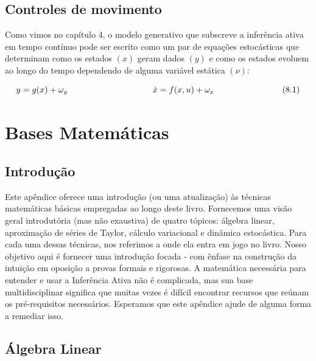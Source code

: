 \documentclass[
  12pt,
]{book}
\begin{document}
\hypertarget{controles-de-movimento}{%
\section{Controles de movimento}\label{controles-de-movimento}}

Como vimos no capítulo 4, o modelo generativo que subscreve a inferência ativa em tempo contínuo pode ser escrito como um par de equações estocásticas que determinam como os estados \((x)\) geram dados \((y)\) e como os estados evoluem ao longo do tempo dependendo de alguma variável estática \((\nu)\):

\[\begin{equation} 
y=g(x)+\omega_y \qquad\qquad\qquad\qquad\quad\quad\quad  \\ 
\dot x = f(x,u) + \omega_x \qquad\qquad\qquad\qquad (8.1)
\end{equation}\]

\cleardoublepage

\hypertarget{appendix-apuxeandice}{%
\appendix}


\hypertarget{bases-matemuxe1ticas}{%
\chapter{Bases Matemáticas}\label{bases-matemuxe1ticas}}

\hypertarget{introduuxe7uxe3o-8}{%
\section{Introdução}\label{introduuxe7uxe3o-8}}

Este apêndice oferece uma introdução (ou uma atualização) às técnicas matemáticas básicas empregadas ao longo deste livro. Fornecemos uma visão geral introdutória (mas não exaustiva) de quatro tópicos: álgebra linear, aproximação de séries de Taylor, cálculo variacional e dinâmica estocástica. Para cada uma dessas técnicas, nos referimos a onde ela entra em jogo no livro. Nosso objetivo aqui é fornecer uma introdução focada - com ênfase na construção da intuição em oposição a provas formais e rigorosas. A matemática necessária para entender e usar a Inferência Ativa não é complicada, mas sua base multidisciplinar significa que muitas vezes é difícil encontrar recursos que reúnam os pré-requisitos necessários. Esperamos que este apêndice ajude de alguma forma a remediar isso.

\hypertarget{uxe1lgebra-linear}{%
\section{Álgebra Linear}\label{uxe1lgebra-linear}}
\end{document}
